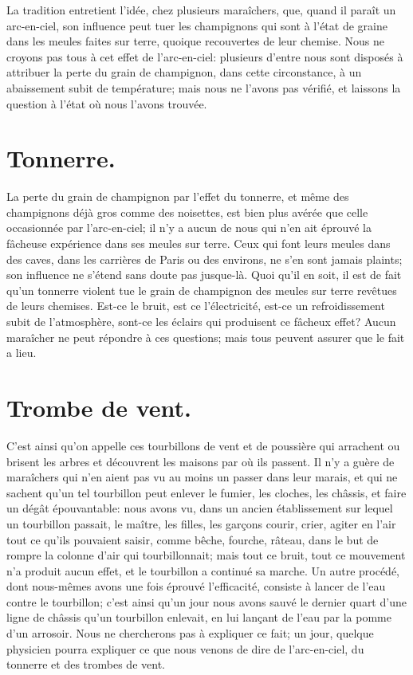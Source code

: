 \documentclass[10pt,a4paper]{book}
\begin{document}
La tradition entretient l'idée, chez plusieurs maraîchers, que, quand il paraît un arc-en-ciel, son influence peut tuer les champignons qui sont à l'état de graine dans les meules faites sur terre, quoique recouvertes de leur chemise. Nous ne croyons pas tous à cet effet de l'arc-en-ciel: plusieurs d'entre nous sont disposés à attribuer la perte du grain de champignon, dans cette circonstance, à un abaissement subit de température; mais nous ne l'avons pas vérifié, et laissons la question à l'état où nous l'avons trouvée.

\section{Tonnerre.}

La perte du grain de champignon par l'effet du tonnerre, et même des champignons déjà gros comme des noisettes, est bien plus avérée que celle occasionnée par l'arc-en-ciel; il n'y a aucun de nous qui n'en ait éprouvé la fâcheuse expérience dans ses meules sur terre. Ceux qui font leurs meules dans des caves, dans les carrières de Paris ou des environs, ne s'en sont jamais plaints; son influence ne s'étend sans doute pas jusque-là. Quoi qu'il en soit, il est de fait qu'un tonnerre violent tue le grain de champignon des meules sur terre revêtues de leurs chemises. Est-ce le bruit, est ce l'électricité, est-ce un refroidissement subit de l'atmosphère, sont-ce les éclairs qui produisent ce fâcheux effet? Aucun maraîcher ne peut répondre à ces questions; mais tous peuvent assurer que le fait a lieu.

\section{Trombe de vent.}

C'est ainsi qu'on appelle ces tourbillons de vent et de poussière qui arrachent ou brisent les arbres et découvrent les maisons par où ils passent. Il n'y a guère de maraîchers qui n'en aient pas vu au moins un passer dans leur marais, et qui ne sachent qu'un tel tourbillon peut enlever le fumier, les cloches, les châssis, et faire un dégât épouvantable: nous avons vu, dans un ancien établissement sur lequel un tourbillon passait, le maître, les filles, les garçons courir, crier, agiter en l'air tout ce qu'ils pouvaient saisir, comme bêche, fourche, râteau, dans le but de rompre la colonne d'air qui tourbillonnait; mais tout ce bruit, tout ce mouvement n'a produit aucun effet, et le tourbillon a continué sa marche. Un autre procédé, dont nous-mêmes avons une fois éprouvé l'efficacité, consiste à lancer de l'eau contre le tourbillon; c'est ainsi qu'un jour nous avons sauvé le dernier quart d'une ligne de châssis qu'un tourbillon enlevait, en lui lançant de l'eau par la pomme d'un arrosoir. Nous ne chercherons pas à expliquer ce fait; un jour, quelque physicien pourra expliquer ce que nous venons de dire de l'arc-en-ciel, du tonnerre et des trombes de vent.
\end{document}
